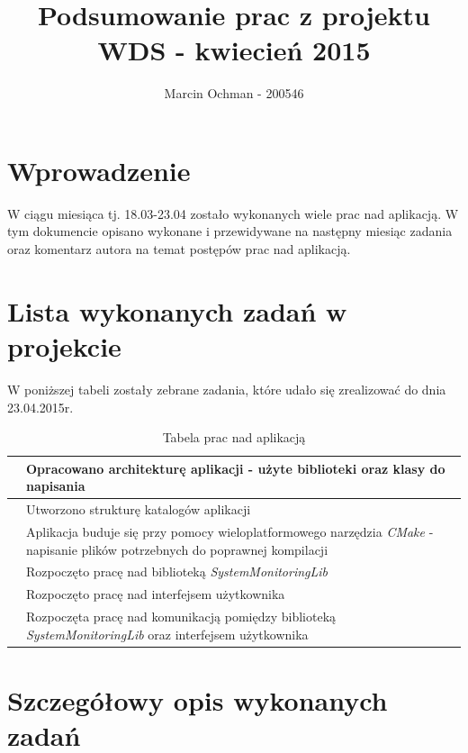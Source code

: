 \documentclass[a4paper]{article}
\title{\textbf{Podsumowanie prac z projektu WDS - kwiecień 2015}}
\author{Marcin Ochman - 200546}
\date{}
\newcounter{counter}
\newcommand\rownumber{\stepcounter{counter}\arabic{counter}}
\begin{document}


\newpage

\tableofcontents
\listoffigures
\listoftables

\newpage

\section{Wprowadzenie}

W ciągu miesiąca tj. 18.03-23.04 zostało wykonanych wiele prac nad aplikacją. W tym dokumencie opisano wykonane i przewidywane na następny miesiąc zadania oraz komentarz autora na temat postępów prac nad aplikacją.


\section{Lista wykonanych zadań w projekcie}

W poniższej tabeli zostały zebrane zadania, które udało się zrealizować do dnia 23.04.2015r.

\begin{table}[h]
\centering
\begin{tabularx}{0.7\linewidth}{ |c|X| }
			\hline 
			\rownumber & Opracowano architekturę aplikacji - użyte biblioteki oraz 
						 klasy do napisania\\ \hline
			\rownumber & Utworzono strukturę katalogów aplikacji \\ \hline
			\rownumber & Aplikacja buduje się przy pomocy wieloplatformowego narzędzia 
						 \textit{CMake} - napisanie plików potrzebnych do poprawnej kompilacji \\ \hline
			\rownumber & Rozpoczęto pracę nad biblioteką \textit{SystemMonitoringLib} \\ \hline
			\rownumber & Rozpoczęto pracę nad interfejsem użytkownika \\ \hline
			\rownumber & Rozpoczęta pracę nad komunikacją pomiędzy biblioteką \textit{SystemMonitoringLib} oraz interfejsem użytkownika \\ \hline
	\end{tabularx}
	\caption{Tabela prac nad aplikacją}
\end{table}

\section{Szczegółowy opis wykonanych zadań}
\end{document}
